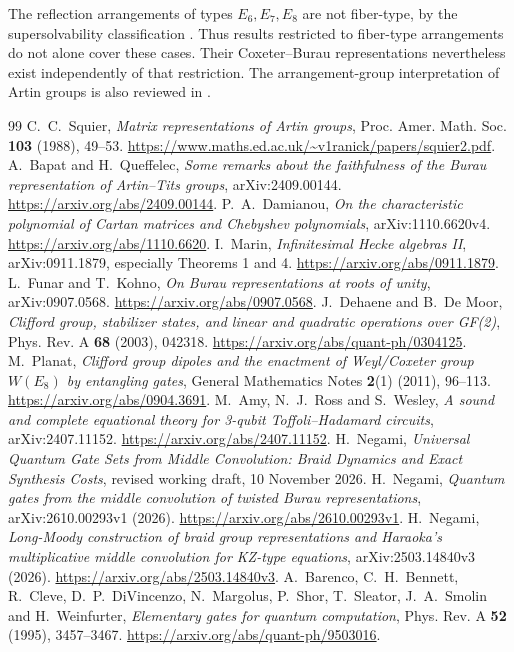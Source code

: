\documentclass[11pt,a4paper]{article}
\theoremstyle{remark}\newtheorem{remark}[theorem]{Remark}
\begin{document}
The reflection arrangements of types $E_6,E_7,E_8$ are not fiber-type,
by the supersolvability classification \cite[Theorem~1.2]{HR}.
Thus results restricted to fiber-type arrangements do not alone cover
these cases.  Their Coxeter--Burau representations nevertheless exist
independently of that restriction.  The arrangement-group interpretation
of Artin groups is also reviewed in \cite[\S2.1]{MarinKrammer}.
\begin{thebibliography}{99}
C.~C.~Squier, \emph{Matrix representations of Artin groups},
Proc. Amer. Math. Soc. \textbf{103} (1988), 49--53.
\url{https://www.maths.ed.ac.uk/~v1ranick/papers/squier2.pdf}.
A.~Bapat and H.~Queffelec, \emph{Some remarks about the faithfulness
of the Burau representation of Artin--Tits groups}, arXiv:2409.00144.
\url{https://arxiv.org/abs/2409.00144}.
P.~A.~Damianou, \emph{On the characteristic polynomial of Cartan
matrices and Chebyshev polynomials}, arXiv:1110.6620v4.
\url{https://arxiv.org/abs/1110.6620}.
I.~Marin, \emph{Infinitesimal Hecke algebras II}, arXiv:0911.1879,
especially Theorems 1 and 4.
\url{https://arxiv.org/abs/0911.1879}.
L.~Funar and T.~Kohno, \emph{On Burau representations at roots of
unity}, arXiv:0907.0568.
\url{https://arxiv.org/abs/0907.0568}.
J.~Dehaene and B.~De Moor, \emph{Clifford group, stabilizer states,
and linear and quadratic operations over GF(2)},
Phys. Rev. A \textbf{68} (2003), 042318.
\url{https://arxiv.org/abs/quant-ph/0304125}.
M.~Planat, \emph{Clifford group dipoles and the enactment of
Weyl/Coxeter group $W(E_8)$ by entangling gates},
General Mathematics Notes \textbf{2}(1) (2011), 96--113.
\url{https://arxiv.org/abs/0904.3691}.
M.~Amy, N.~J.~Ross and S.~Wesley,
\emph{A sound and complete equational theory for 3-qubit
Toffoli--Hadamard circuits}, arXiv:2407.11152.
\url{https://arxiv.org/abs/2407.11152}.
H.~Negami, \emph{Universal Quantum Gate Sets from Middle Convolution:
Braid Dynamics and Exact Synthesis Costs}, revised working draft,
10 November 2026.
H.~Negami, \emph{Quantum gates from the middle convolution of twisted
Burau representations}, arXiv:2610.00293v1 (2026).
\url{https://arxiv.org/abs/2610.00293v1}.
H.~Negami, \emph{Long-Moody construction of braid group representations
and Haraoka's multiplicative middle convolution for KZ-type equations},
arXiv:2503.14840v3 (2026).
\url{https://arxiv.org/abs/2503.14840v3}.
A.~Barenco, C.~H.~Bennett, R.~Cleve, D.~P.~DiVincenzo, N.~Margolus,
P.~Shor, T.~Sleator, J.~A.~Smolin and H.~Weinfurter,
\emph{Elementary gates for quantum computation},
Phys. Rev. A \textbf{52} (1995), 3457--3467.
\url{https://arxiv.org/abs/quant-ph/9503016}.


\end{thebibliography}
\end{document}
